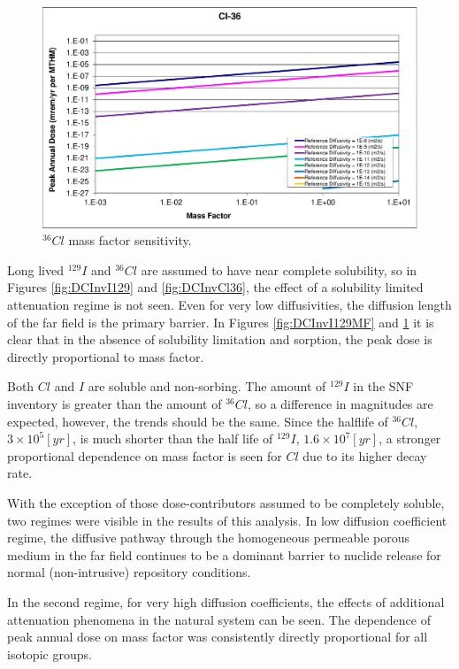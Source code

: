 \begin{figure}[ht]
\begin{minipage}[b]{0.45\linewidth}
\includegraphics[width=\linewidth]{./chapters/nuclide_sensitivity/clay/DiffCoeffAndInvEBSFail/Cl-36-MF.eps}
\caption{$^{36}Cl$ mass factor sensitivity.}
\label{fig:DCInvCl36MF}

\end{minipage}
\end{figure}

Long lived $^{129}I$ and $^{36}Cl$ are assumed to have near complete solubility, 
so in Figures \ref{fig:DCInvI129} and \ref{fig:DCInvCl36}, the effect of a 
solubility limited attenuation regime is not seen. Even for very low 
diffusivities, the diffusion length of the far field is the primary barrier. In 
Figures \ref{fig:DCInvI129MF} and \ref{fig:DCInvCl36MF} it is clear that in the 
absence of solubility limitation and sorption, the peak dose is directly 
proportional to mass factor. 

Both $Cl$ and $I$ are soluble and non-sorbing. The amount of $^{129}I$ in the 
\gls{SNF} inventory is greater than the amount of $^{36}Cl$, so a difference in 
magnitudes are expected, however, the trends should be the same. Since the 
halflife of $^{36}Cl$, $3\times10^5[yr]$, is much shorter than the half life of 
$^{129}I$, $1.6\times10^7[yr]$, a stronger proportional dependence on mass 
factor is seen for $Cl$ due to its higher decay rate. 

With the exception of those dose-contributors assumed to be completely soluble, 
two regimes were visible in the results of this analysis. In low diffusion 
coefficient regime, the diffusive pathway through the homogeneous permeable 
porous medium in the far field continues to be a  dominant barrier to nuclide 
release for normal (non-intrusive) repository conditions. 

In the second regime, for very high diffusion coefficients, the effects of 
additional attenuation phenomena in the natural system can be seen.  The 
dependence of peak annual dose on mass factor was consistently directly 
proportional for all isotopic groups.

